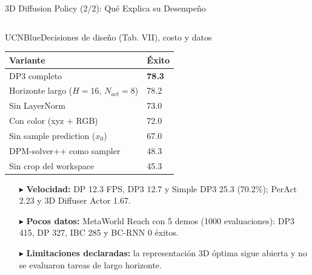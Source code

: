 \documentclass[aspectratio=169,10pt,xcolor={dvipsnames,table}]{beamer}
\newcommand{\CardHeightTall}{46mm}         %
\newcommand{\TabFont}{\fontsize{5.3}{6.4}\selectfont}                    %
\begin{document}
\begin{frame}{3D Diffusion Policy (2/2): Qué Explica su Desempeño}
\begin{columns}[T, onlytextwidth]
\begin{column}{0.49\textwidth}
\begin{Card}[height=\CardHeightTall]{UCNBlue}{Decisiones de diseño (Tab. VII), costo y datos}
        {\TabFont
        \setlength{\tabcolsep}{1.4pt}
        \renewcommand{\arraystretch}{1.0}
        \begin{tabular}{@{}L{50mm} C{14mm}@{}}
          \toprule
          \textbf{Variante} & \textbf{Éxito} \\
          \midrule
           DP3 completo & \textbf{78.3} \\
          Horizonte largo ($H = 16$, $N_{act} = 8$) & 78.2 \\
          Sin LayerNorm & 73.0 \\
          Con color (xyz + RGB) & 72.0 \\
          Sin sample prediction ($x_0$) & 67.0 \\
          DPM-solver++ como sampler & 48.3 \\
          Sin crop del workspace & 45.3 \\
          \bottomrule
        \end{tabular}\par
        \vspace{1mm}
        \begin{itemize}\setlength{\itemsep}{0.6pt}
          \item[\textcolor{UCNBlue}{$\blacktriangleright$}] \textbf{Velocidad:} DP 12.3 FPS, DP3 12.7 y Simple DP3 25.3 (70.2\%); PerAct 2.23 y 3D Diffuser Actor 1.67.
          \item[\textcolor{UCNBlue}{$\blacktriangleright$}] \textbf{Pocos datos:} MetaWorld Reach con 5 demos (1000 evaluaciones): DP3 415, DP 327, IBC 285 y BC-RNN 0 éxitos.
          \item[\textcolor{UCNBlue}{$\blacktriangleright$}] \textbf{Limitaciones declaradas:} la representación 3D óptima sigue abierta y no se evaluaron tareas de largo horizonte.
        \end{itemize}}
      \end{Card}
    \end{column}
  \end{columns}
\end{frame}
\end{document}
